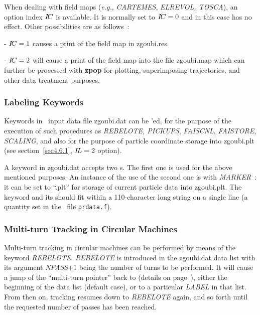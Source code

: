 {\medskip

\noindent {\small $\bullet$} When dealing with field  maps (\emph{e.g.}, \textsl{CARTEMES}, \textsl{ELREVOL, 
 TOSCA}), an option index $ I\!C $ is available.
  It is normally set to $I\!C =0$ and in this case has no effect.
 Other possibilities are as follows~: 

\smallskip 

- $ I\!C=1 $ causes a print of the field map in zgoubi.res. 

\smallskip 

- $ I\!C=2 $ will cause a print   of the field map into the file  zgoubi.map 
which can further be processed with \textbf{zpop} for plotting, superimposing trajectories, and other data treatment purposes. 


 \subsubsection{Labeling Keywords}\label{sec4.6.8}

Keywords in \zgou\ input data file zgoubi.dat can be \LABEL'ed, for the purpose of 
the execution of such procedures as  \textsl{REBELOTE,  PICKUPS}, 
\textsl{FAISCNL}, \textsl{FAISTORE}, 
 \textsl{SCALING}, and also for the purpose of 
particle coordinate storage into zgoubi.plt (see section~\ref{sec4.6.1}, 
$I\!L=2$ option). 

\medskip 

\noindent A keyword in zgoubi.dat accepts two \LABEL s. The first one is used for the 
above mentioned purposes. An instance of the use of the  second one is 
 with \textsl{MARKER}~: it can be set to ``.plt''  for storage of current particle data 
into zgoubi.plt. The keyword and its \LABEL[s] should fit within a 110-character 
long string on a single line (a quantity set in the \FORTRAN\ file \texttt{prdata.f}). 

\subsubsection{Multi-turn Tracking in Circular Machines \label{sec4.6.5} } 

Multi-turn tracking  in circular machines can be performed by
means of the keyword \textsl{REBELOTE}. \textsl{REBELOTE} is introduced in 
the  zgoubi.dat data list with its argument \textsl{NPASS}$+1$ being the number of turns to be 
performed. 
It will cause a jump of  the ``multi-turn pointer''  back to (details on page~\pageref{REBELOTE}), 
either the beginning of the data list (default case), or to a particular \textsl{LABEL} 
in that list. From then on, tracking resumes down to \textsl{REBELOTE} again, and so forth until the 
requested number of passes has been reached. 

}

